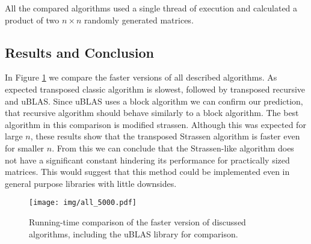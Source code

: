 \documentclass[a4paper,11pt]{article}
\begin{document}
 All the compared algorithms used a single thread of execution and calculated a product of two $n \times n$ randomly generated matrices. 



\subsection{Results and Conclusion}

In Figure \ref{fig:all_algorithms} we compare the faster versions of all described algorithms. As expected transposed classic algorithm is slowest, followed by transposed recursive and uBLAS. Since uBLAS uses a block algorithm we can confirm our prediction, that recursive algorithm should behave similarly to a block algorithm. The best algorithm in this comparison is modified strassen. 
Although this was expected for large $n$, these results show that the transposed Strassen algorithm is faster even for smaller $n$. From this we can conclude that the Strassen-like algorithm does not have a significant constant hindering its performance for practically sized matrices. This would suggest that this method could be implemented even in general purpose libraries with little downsides.

\begin{figure}[h]
\centering
\texttt{[image: img/all\_5000.pdf]}
\caption{Running-time comparison of the faster version of discussed algorithms, including the uBLAS library for comparison.}
\label{fig:all_algorithms}
\end{figure}
\end{document}
